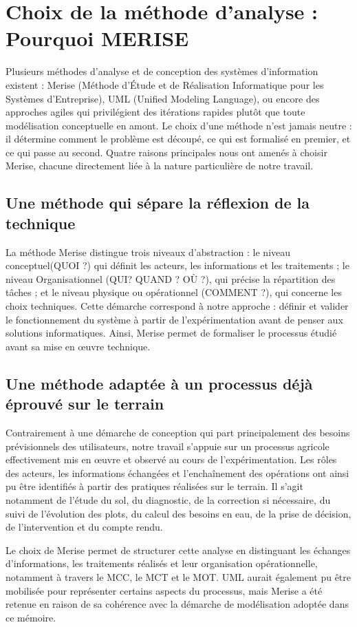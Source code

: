 \section{Choix de la méthode d’analyse : Pourquoi MERISE}
Plusieurs méthodes d'analyse et de conception des systèmes d'information existent : Merise (Méthode d’Étude et de Réalisation Informatique pour les Systèmes d’Entreprise), UML (Unified Modeling Language), ou encore des approches agiles qui privilégient des itérations rapides plutôt que toute modélisation conceptuelle en amont. Le choix d'une méthode n'est jamais neutre : il détermine comment le problème est découpé, ce qui est formalisé en premier, et ce qui passe au second. Quatre raisons principales nous ont amenés à choisir Merise, chacune directement liée à la nature particulière de notre travail.

\subsection{Une méthode qui sépare la réflexion de la technique}
La méthode Merise  distingue trois niveaux d’abstraction : le niveau conceptuel(QUOI ?) qui définit les acteurs, les informations et les traitements ; le niveau Organisationnel (QUI? QUAND ? OÙ ?), qui précise la répartition des tâches ; et le niveau physique ou opérationnel (COMMENT ?), qui concerne les choix techniques. Cette démarche correspond à notre approche : définir et valider le fonctionnement du système à partir de l'expérimentation avant de penser aux solutions informatiques. Ainsi, Merise permet de formaliser le processus étudié avant sa mise en œuvre technique.

\subsection{Une méthode adaptée à un processus déjà éprouvé sur le terrain}
Contrairement à une démarche de conception qui part principalement des besoins prévisionnels des utilisateurs, notre travail s’appuie sur un processus agricole effectivement mis en œuvre et observé au cours de l’expérimentation. Les rôles des acteurs, les informations échangées et l’enchaînement des opérations ont ainsi pu être identifiés à partir des pratiques réalisées sur le terrain. Il s’agit notamment de l’étude du sol, du diagnostic, de la correction si nécessaire, du suivi de l'évolution des plots, du calcul des besoins en eau, de la prise de décision, de l’intervention et du compte rendu.

Le choix de Merise permet de structurer cette analyse en distinguant les échanges d’informations, les traitements réalisés et leur organisation opérationnelle, notamment à travers le MCC, le MCT et le MOT. UML aurait également pu être mobilisée pour représenter certains aspects du processus, mais Merise a été retenue en raison de sa cohérence avec la démarche de modélisation adoptée dans ce mémoire.

